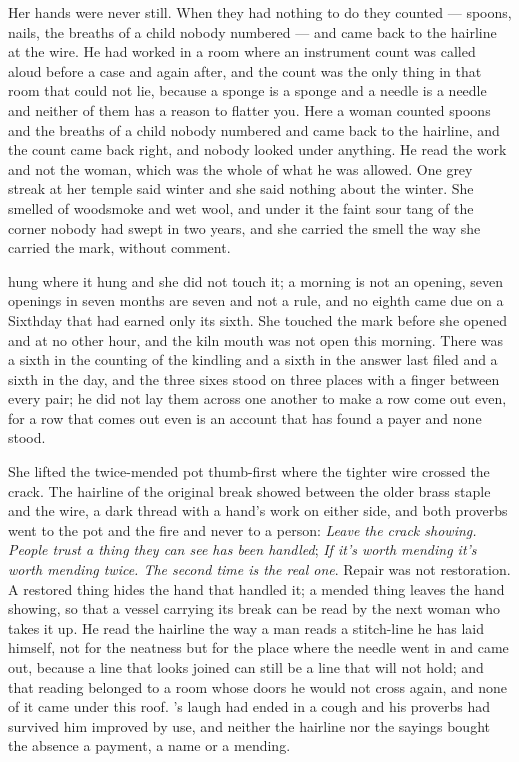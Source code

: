 Her hands were never still. When they had nothing to do they counted --- spoons, nails, the breaths of a child nobody numbered --- and came back to the hairline at the wire. He had worked in a room where an instrument count was called aloud before a case and again after, and the count was the only thing in that room that could not lie, because a sponge is a sponge and a needle is a needle and neither of them has a reason to flatter you. Here a woman counted spoons and the breaths of a child nobody numbered and came back to the hairline, and the count came back right, and nobody looked under anything. He read the work and not the woman, which was the whole of what he was allowed. One grey streak at her temple said winter and she said nothing about the winter. She smelled of woodsmoke and wet wool, and under it the faint sour tang of the corner nobody had swept in two years, and she carried the smell the way she carried the mark, without comment.

 hung where it hung and she did not touch it; a morning is not an opening, seven openings in seven months are seven and not a rule, and no eighth came due on a Sixthday that had earned only its sixth. She touched the mark before she opened  and at no other hour, and the kiln mouth was not open this morning. There was a sixth in the counting of the kindling and a sixth in the answer last filed and a sixth in the day, and the three sixes stood on three places with a finger between every pair; he did not lay them across one another to make a row come out even, for a row that comes out even is an account that has found a payer and none stood.

She lifted the twice-mended pot thumb-first where the tighter wire crossed the crack. The hairline of the original break showed between the older brass staple and the wire, a dark thread with a hand's work on either side, and both proverbs went to the pot and the fire and never to a person: \emph{Leave the crack showing. People trust a thing they can see has been handled}; \emph{If it's worth mending it's worth mending twice. The second time is the real one}. Repair was not restoration. A restored thing hides the hand that handled it; a mended thing leaves the hand showing, so that a vessel carrying its break can be read by the next woman who takes it up. He read the hairline the way a man reads a stitch-line he has laid himself, not for the neatness but for the place where the needle went in and came out, because a line that looks joined can still be a line that will not hold; and that reading belonged to a room whose doors he would not cross again, and none of it came under this roof. 's laugh had ended in a cough and his proverbs had survived him improved by use, and neither the hairline nor the sayings bought the absence a payment, a name or a mending.

